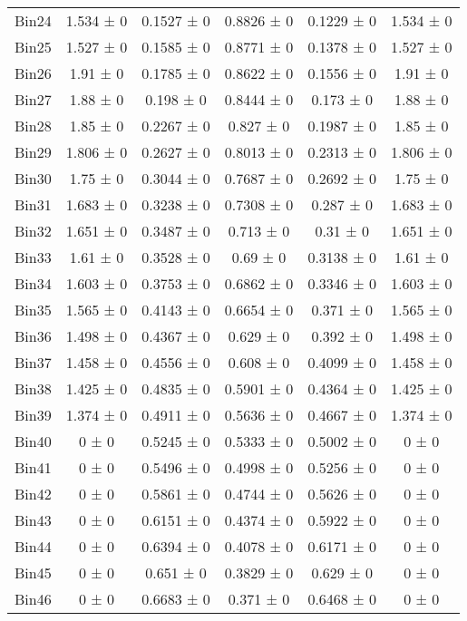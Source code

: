 \begin{tabular}{@{\extracolsep{4pt}}lccccc@{}}
     Bin24 & 1.534 ± 0 & 0.1527 ± 0 & 0.8826 ± 0 & 0.1229 ± 0 & 1.534 ± 0 \\ 
     Bin25 & 1.527 ± 0 & 0.1585 ± 0 & 0.8771 ± 0 & 0.1378 ± 0 & 1.527 ± 0 \\ 
     Bin26 & 1.91 ± 0 & 0.1785 ± 0 & 0.8622 ± 0 & 0.1556 ± 0 & 1.91 ± 0 \\ 
     Bin27 & 1.88 ± 0 & 0.198 ± 0 & 0.8444 ± 0 & 0.173 ± 0 & 1.88 ± 0 \\ 
     Bin28 & 1.85 ± 0 & 0.2267 ± 0 & 0.827 ± 0 & 0.1987 ± 0 & 1.85 ± 0 \\ 
     Bin29 & 1.806 ± 0 & 0.2627 ± 0 & 0.8013 ± 0 & 0.2313 ± 0 & 1.806 ± 0 \\ 
     Bin30 & 1.75 ± 0 & 0.3044 ± 0 & 0.7687 ± 0 & 0.2692 ± 0 & 1.75 ± 0 \\ 
     Bin31 & 1.683 ± 0 & 0.3238 ± 0 & 0.7308 ± 0 & 0.287 ± 0 & 1.683 ± 0 \\ 
     Bin32 & 1.651 ± 0 & 0.3487 ± 0 & 0.713 ± 0 & 0.31 ± 0 & 1.651 ± 0 \\ 
     Bin33 & 1.61 ± 0 & 0.3528 ± 0 & 0.69 ± 0 & 0.3138 ± 0 & 1.61 ± 0 \\ 
     Bin34 & 1.603 ± 0 & 0.3753 ± 0 & 0.6862 ± 0 & 0.3346 ± 0 & 1.603 ± 0 \\ 
     Bin35 & 1.565 ± 0 & 0.4143 ± 0 & 0.6654 ± 0 & 0.371 ± 0 & 1.565 ± 0 \\ 
     Bin36 & 1.498 ± 0 & 0.4367 ± 0 & 0.629 ± 0 & 0.392 ± 0 & 1.498 ± 0 \\ 
     Bin37 & 1.458 ± 0 & 0.4556 ± 0 & 0.608 ± 0 & 0.4099 ± 0 & 1.458 ± 0 \\ 
     Bin38 & 1.425 ± 0 & 0.4835 ± 0 & 0.5901 ± 0 & 0.4364 ± 0 & 1.425 ± 0 \\ 
     Bin39 & 1.374 ± 0 & 0.4911 ± 0 & 0.5636 ± 0 & 0.4667 ± 0 & 1.374 ± 0 \\ 
     Bin40 & 0 ± 0 & 0.5245 ± 0 & 0.5333 ± 0 & 0.5002 ± 0 & 0 ± 0 \\ 
     Bin41 & 0 ± 0 & 0.5496 ± 0 & 0.4998 ± 0 & 0.5256 ± 0 & 0 ± 0 \\ 
     Bin42 & 0 ± 0 & 0.5861 ± 0 & 0.4744 ± 0 & 0.5626 ± 0 & 0 ± 0 \\ 
     Bin43 & 0 ± 0 & 0.6151 ± 0 & 0.4374 ± 0 & 0.5922 ± 0 & 0 ± 0 \\ 
     Bin44 & 0 ± 0 & 0.6394 ± 0 & 0.4078 ± 0 & 0.6171 ± 0 & 0 ± 0 \\ 
     Bin45 & 0 ± 0 & 0.651 ± 0 & 0.3829 ± 0 & 0.629 ± 0 & 0 ± 0 \\ 
     Bin46 & 0 ± 0 & 0.6683 ± 0 & 0.371 ± 0 & 0.6468 ± 0 & 0 ± 0 \\ 

\end{tabular}
